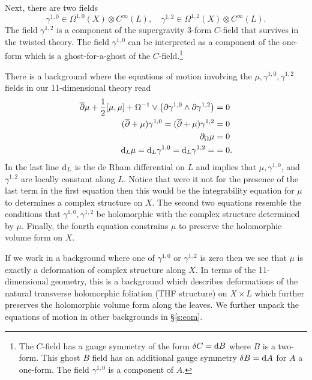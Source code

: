 Next, there are two fields 
\[
\gamma^{1,0} \in \Omega^{1,0} (X) \otimes C^\infty(L), \quad \gamma^{1,2} \in \Omega^{1,2}(X) \otimes C^\infty(L) .
\]
The field $\gamma^{1,2}$ is a component of the supergravity $3$-form $C$-field that survives in the twisted theory. 
The field $\gamma^{1,0}$ can be interpreted as a component of the one-form which is a ghost-for-a-ghost of the $C$-field.\footnote{The $C$-field has a gauge symmetry of the form $\delta C = {\rm d} B$ where $B$ is a two-form.
This ghost $B$ field has an additional gauge symmetry $\delta B = {\rm d} A$ for $A$ a one-form.
The field $\gamma^{1,0}$ is a component of $A$.}

There is a background where the equations of motion involving the $\mu, \gamma^{1,0}, \gamma^{1,2}$ fields in our 11-dimensional theory read
\begin{align*}
\overline{\partial} \mu + \frac12 [\mu, \mu] + \Omega^{-1} \vee \left(\partial \gamma^{1,0} \wedge \partial \gamma^{1,2} \right) & = 0 \\
(\overline{\partial} + \mu) \gamma^{1,0} = 
(\overline{\partial} + \mu) \gamma^{1,2} & = 0 \\
\partial_{\Omega} \mu & = 0 \\
{\rm d}_L \mu = {\rm d}_L \gamma^{1,0} = {\rm d}_L \gamma^{1,2} = & = 0 .
\end{align*}
In the last line ${\rm d}_L$ is the de Rham differential on $L$ and implies that $\mu, \gamma^{1,0}$, and $\gamma^{1,2}$ are locally constant along $L$. 
Notice that were it not for the presence of the last term in the first equation then this would be the integrability equation for $\mu$ to determines a complex structure on $X$.
The second two equations resemble the conditions that $\gamma^{1,0}, \gamma^{1,2}$ be holomorphic with the complex structure determined by $\mu$. 
Finally, the fourth equation constrains $\mu$ to preserve the holomorphic volume form on $X$. 

If we work in a background where one of $\gamma^{1,0}$ or $\gamma^{1,2}$ is zero then we see that $\mu$ is exactly a deformation of complex structure along $X$. 
In terms of the 11-dimensional geometry, this is a background which describes deformations of the natural transverse holomorphic foliation (THF structure) on $X \times L$ which further preserves the holomorphic volume form along the leaves.
We further unpack the equations of motion in other backgrounds in \S \ref{s:eom}.


